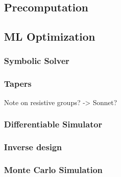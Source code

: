 \subsection{Precomputation}

\subsection{ML Optimization}

\subsubsection{Symbolic Solver}

\subsubsection{Tapers}

Note on resistive groups? -> Sonnet?

\subsubsection{Differentiable Simulator}

\subsubsection{Inverse design}

\subsubsection{Monte Carlo Simulation}







